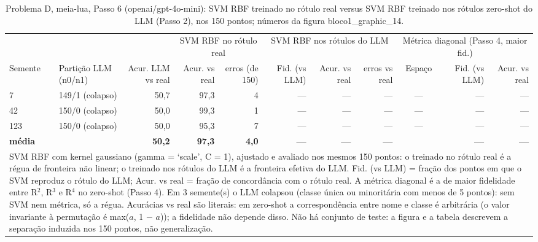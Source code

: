 \begin{table}[htbp]
\centering
\small
\caption{Problema D, meia-lua, Passo 6 (openai/gpt-4o-mini): SVM RBF treinado no rótulo real versus SVM RBF treinado nos rótulos zero-shot do LLM (Passo 2), nos 150 pontos; números da figura bloco1\_graphic\_14.}
\label{tab:bloco1_D_passo6_svm_gpt4mini}
\begin{tabular}{llrrrrrrcrr}
\toprule
 &  &  & \multicolumn{2}{c}{SVM RBF no rótulo real} & \multicolumn{3}{c}{SVM RBF nos rótulos do LLM} & \multicolumn{3}{c}{Métrica diagonal (Passo 4, maior fid.)} \\ \cmidrule(lr){4-5} \cmidrule(lr){6-8} \cmidrule(lr){9-11}
Semente & Partição LLM (n0/n1) & Acur. LLM vs real & Acur. vs real & erros (de 150) & Fid. (vs LLM) & Acur. vs real & erros vs real & Espaço & Fid. (vs LLM) & Acur. vs real \\
\midrule
7 & 149/1 (colapso) & 50,7 & 97,3 & 4 & — & — & — & — & — & — \\
42 & 150/0 (colapso) & 50,0 & 99,3 & 1 & — & — & — & — & — & — \\
123 & 150/0 (colapso) & 50,0 & 95,3 & 7 & — & — & — & — & — & — \\
\textbf{média} &  & \textbf{50,2} & \textbf{97,3} & \textbf{4,0} & \textbf{—} & \textbf{—} & \textbf{—} &  & \textbf{—} & \textbf{—} \\
\bottomrule
\multicolumn{11}{p{0.95\linewidth}}{\footnotesize SVM RBF com kernel gaussiano (gamma = `scale', C = 1), ajustado e avaliado nos mesmos 150 pontos: o treinado no rótulo real é a régua de fronteira não linear; o treinado nos rótulos do LLM é a fronteira efetiva do LLM. Fid. (vs LLM) = fração dos pontos em que o SVM reproduz o rótulo do LLM; Acur. vs real = fração de concordância com o rótulo real. A métrica diagonal é a de maior fidelidade entre R$^2$, R$^3$ e R$^4$ no zero-shot (Passo 4). Em 3 semente(s) o LLM colapsou (classe única ou minoritária com menos de 5 pontos): sem SVM nem métrica, só a régua. Acurácias vs real são literais: em zero-shot a correspondência entre nome e classe é arbitrária (o valor invariante à permutação é max($a$, 1 $-$ $a$)); a fidelidade não depende disso. Não há conjunto de teste: a figura e a tabela descrevem a separação induzida nos 150 pontos, não generalização.} \\
\end{tabular}
\end{table}
